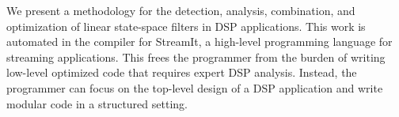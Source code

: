 \label{sec:conclusion}

We present a methodology for the detection, analysis, combination, and
optimization of linear state-space filters in DSP applications.  This
work is automated in the compiler for StreamIt, a high-level
programming language for streaming applications.  This frees the
programmer from the burden of writing low-level optimized code that
requires expert DSP analysis.  Instead, the programmer can focus on
the top-level design of a DSP application and write modular code in a
structured setting.






